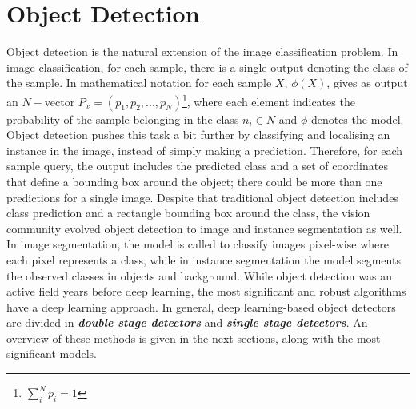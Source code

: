 \chapter{Object Detection} \label{Chapter:ObjectDetection}

Object detection is the natural extension of the image classification problem. In image classification, for each sample, there is a single output denoting the class of the sample. In mathematical notation for each sample $X$, $\phi(X)$, gives as output an $N-$vector $P_x=(p_1,p_2,...,p_N)$\footnote{$\sum^N_i p_i=1$}, where each element indicates the probability of the sample belonging in the class $n_i \in N$ and $\phi$ denotes the model. Object detection pushes this task a bit further by classifying and localising an instance in the image, instead of simply making a prediction. Therefore, for each sample query, the output includes the predicted class and a set of coordinates that define a bounding box around the object; there could be more than one predictions for a single image. Despite that traditional object detection includes class prediction and a rectangle bounding box around the class, the vision community evolved object detection to image and instance segmentation as well. In image segmentation, the model is called to classify images pixel-wise where each pixel represents a class, while in instance segmentation the model segments the observed classes in objects and background. While object detection was an active field years before deep learning, the most significant and robust algorithms have a deep learning approach. In general, deep learning-based object detectors are divided in \textbf{\textit{double stage detectors}} and \textbf{\textit{single stage detectors}}. An overview of these methods is given in the next sections, along with the most significant models. 

